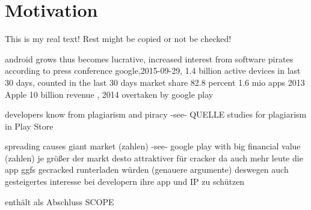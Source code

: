 \section{Motivation}\label{section:introduction-motivation}
This is my real text! Rest might be copied or not be checked!

%
android grows thus becomes lucrative, increased interest from software pirates
according to press conference google,2015-09-29, 1.4 billion active devices in last 30 days, counted in the last 30 days\cite{androidDevices}
market share 82.8 percent \cite{androidShare}
1.6 mio apps \cite{statistaAppStore}
2013 Apple 10 billion revenue \cite{statistaRevenue}, 2014 overtaken by google play \cite{wiwoValue}

developers know from plagiarism and piracy -see- QUELLE
studies for plagiarism in Play Store \cite{bitdefenderPlagiarism}
\cite{munteanLicense}
%

spreading causes giant market (zahlen) -see- google play with big financial value (zahlen)\newline
je größer der markt desto attraktiver für cracker da auch mehr leute die app ggfs gecracked runterladen würden (genauere argumente)\newline
deswegen auch gesteigertes interesse bei developern ihre app und IP zu schützen\newline

enthält als Abschluss SCOPE\newline
